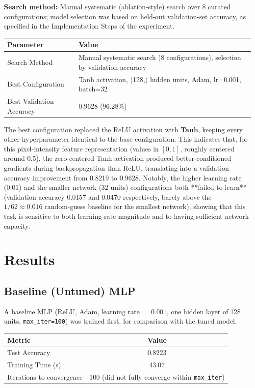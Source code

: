 \documentclass[12pt,a4paper]{article}
\begin{document}
\textbf{Search method:} Manual systematic (ablation-style) search over 8 curated configurations;
model selection was based on held-out validation-set accuracy, as specified in the Implementation
Steps of the experiment.

\begin{tabular}{ll}
\toprule
Parameter & Value\\
\midrule
Search Method & Manual systematic search (8 configurations), selection by validation accuracy \\
Best Configuration & Tanh activation, (128,) hidden units, Adam, lr=0.001, batch=32 \\
Best Validation Accuracy & 0.9628 (96.28\%) \\
\bottomrule
\end{tabular}

The best configuration replaced the ReLU activation with \textbf{Tanh}, keeping every other
hyperparameter identical to the base configuration. This indicates that, for this
pixel-intensity feature representation (values in $[0,1]$, roughly centered around 0.5), the
zero-centered Tanh activation produced better-conditioned gradients during backpropagation than
ReLU, translating into a validation accuracy improvement from 0.8219 to 0.9628. Notably, the
higher learning rate (0.01) and the smaller network (32 units) configurations both **failed to
learn** (validation accuracy 0.0157 and 0.0470 respectively, barely above the $1/62 \approx 0.016$
random-guess baseline for the smallest network), showing that this task is sensitive to both
learning-rate magnitude and to having sufficient network capacity.

\section{Results}

\subsection{Baseline (Untuned) MLP}
A baseline MLP (ReLU, Adam, learning rate $=0.001$, one hidden layer of 128 units,
\texttt{max\_iter=100}) was trained first, for comparison with the tuned model.

\begin{tabular}{lc}
\toprule
Metric & Value\\
\midrule
Test Accuracy & 0.8223 \\
Training Time (s) & 43.07 \\
Iterations to convergence & 100 (did not fully converge within \texttt{max\_iter}) \\
\bottomrule
\end{tabular}
\end{document}

